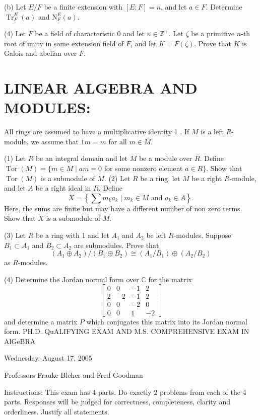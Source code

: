 \documentclass[10pt]{article}
\begin{document}
(b) Let $E / F$ be a finite extension with $[E: F]=n$, and let $a \in F$. Determine $\operatorname{Tr}_{F}^{E}(a)$ and $\mathrm{N}_{F}^{E}(a)$.

(4) Let $F$ be a field of characteristic 0 and let $n \in \mathbb{Z}^{+}$. Let $\zeta$ be a primitive $n$-th root of unity in some extension field of $F$, and let $K=F(\zeta)$. Prove that $K$ is Galois and abelian over $F$.

\section{LINEAR ALGEBRA AND MODULES:}
All rings are assumed to have a multiplicative identity 1 . If $M$ is a left $R$-module, we assume that $1 m=m$ for all $m \in M$.

(1) Let $R$ be an integral domain and let $M$ be a module over $R$. Define $\operatorname{Tor}(M)=\{m \in M \mid a m=0$ for some nonzero element $a \in R\}$. Show that $\operatorname{Tor}(M)$ is a submodule of $M$. (2) Let $R$ be a ring, let $M$ be a right $R$-module, and let $A$ be a right ideal in $R$. Define
$$
X=\left\{\sum m_{k} a_{k} \mid m_{k} \in M \text { and } a_{k} \in A\right\} .
$$
Here, the sums are finite but may have a different number of non zero terms. Show that $X$ is a submodule of $M$.

(3) Let $R$ be a ring with 1 and let $A_{1}$ and $A_{2}$ be left $R$-modules. Suppose $B_{1} \subset A_{1}$ and $B_{2} \subset A_{2}$ are submodules. Prove that
$$
\left(A_{1} \oplus A_{2}\right) /\left(B_{1} \oplus B_{2}\right) \cong\left(A_{1} / B_{1}\right) \oplus\left(A_{2} / B_{2}\right)
$$
as $R$-modules.

(4) Determine the Jordan normal form over $\mathbb{C}$ for the matrix
$$
\left[\begin{array}{rrrr}
0 & 0 & -1 & 2 \\
2 & -2 & -1 & 2 \\
0 & 0 & -2 & 0 \\
0 & 0 & 1 & -2
\end{array}\right]
$$
and determine a matrix $P$ which conjugates this matrix into its Jordan normal form. PH.D. QuALIFYING EXAM AND M.S. COMPREHENSIVE EXAM IN AlGeBRA

Wednesday, August 17, 2005

Professors Frauke Bleher and Fred Goodman

Instructions: This exam has 4 parts. Do exactly 2 problems from each of the 4 parts. Responses will be judged for correctness, completeness, clarity and orderliness. Justify all statements.
\end{document}
